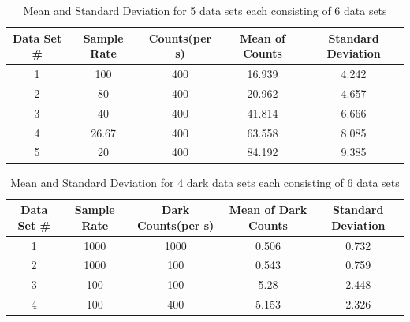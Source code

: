 \documentclass[letterpaper,12pt]{article}
\begin{document}
\begin{table}[ht]
\caption{Mean and Standard Deviation for 5 data sets each consisting of 6 data sets} %
\centering %
\begin{tabular}{c c c c c} %
\hline\hline %
Data Set \# & Sample Rate & Counts(per s) & Mean of Counts & Standard Deviation \\ [0.5ex] %
\hline %
1 & 100 & 400 & 16.939 & 4.242\\ %
2 & 80 & 400& 20.962  & 4.657 \\
3 & 40 & 400& 41.814 &  6.666 \\
4 & 26.67 & 400 & 63.558 & 8.085   \\
5 & 20 & 400 & 84.192 &  9.385 \\  [1ex] %
\hline %
\end{tabular}
\label{table:nonlin} %
\end{table}


\begin{table}[t]
\caption{Mean and Standard Deviation for 4 dark data sets each consisting of 6 data sets } %
\centering %
\begin{tabular}{c c c c c} %
\hline\hline %
Data Set \# & Sample Rate & Dark Counts(per s) & Mean of Dark Counts & Standard Deviation \\ [0.5ex] %
\hline %
1 & 1000 & 1000 &  0.506 &  0.732   \\ %
2 & 1000 & 100&   0.543   & 0.759 \\
3 & 100 & 100&    5.28  &  2.448      \\
4 & 100 & 400 &   5.153   &   2.326   \\  [1ex] %
\hline %
\end{tabular}
\label{table:nonlin} %
\end{table}
\end{document}
